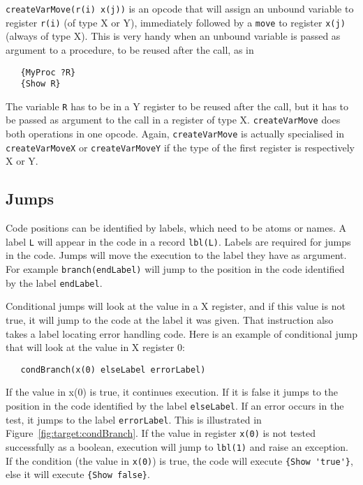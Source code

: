 \documentclass[a4paper]{memoir}
\begin{document}
\lstinline!createVarMove(r(i) x(j))! is an opcode that will assign an unbound variable to
register \lstinline!r(i)! (of type X or Y), immediately followed by a
\lstinline!move! to register \lstinline!x(j)! (always of type X). This is very
handy when an unbound variable is passed as argument to a procedure, to be
reused after the call, as in

\begin{lstlisting}
   {MyProc ?R}
   {Show R}
\end{lstlisting}

The variable \lstinline!R! has to be in a Y register to be reused after the
call, but it has to be passed as argument to the call in a register of type X.
\lstinline!createVarMove! does both operations in one opcode.
Again, \lstinline!createVarMove! is actually specialised in
\lstinline!createVarMoveX! or \lstinline!createVarMoveY! if the type of the
first register is respectively X or Y.


\subsection{Jumps}\label{sec:opcode:jumps}
Code positions can be identified by labels, which need to be atoms or names. A label \lstinline!L! will appear in the code in a record \lstinline!lbl(L)!. 
Labels are required for jumps in the code. 
Jumps will move the execution to the label they have as argument. For example \lstinline!branch(endLabel)! will jump to the position in the code identified by the label \lstinline!endLabel!.

Conditional jumps will look at the value in a X register, and if this value is
not true, it will jump to the code at the label it was given. That instruction
also takes a label locating error handling code. Here is an example of
conditional jump that will look at the value in X register 0:
\begin{lstlisting}
   condBranch(x(0) elseLabel errorLabel)
\end{lstlisting}
If the value in x(0) is
true, it continues execution. If it is false it jumps to the position in the
code identified by the label \lstinline!elseLabel!. If an error occurs in the
test, it jumps to the label \lstinline!errorLabel!. This is illustrated in Figure~\ref{fig:target:condBranch}.
If the value in register \lstinline!x(0)! is not tested successfully as a
boolean, execution will jump to \lstinline!lbl(1)! and raise an exception. If
the condition (the value in \lstinline!x(0)!) is true, the code will execute
\lstinline!{Show 'true'}!, else it will execute \lstinline!{Show false}!.
\end{document}
